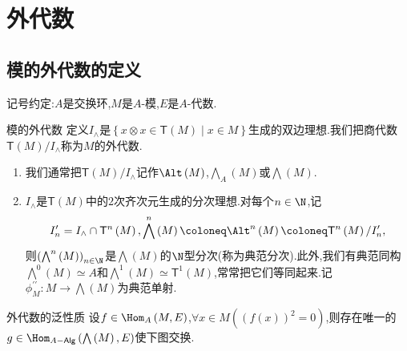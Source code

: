 \chapter{外代数}

\section{模的外代数的定义}

记号约定:$A$是交换环,$M$是$A$-模,$E$是$A$-代数.

\begin{definition}{模的外代数}{}
	定义$I_{\wedge}$是$\left\{x\otimes x\in\mathsf{T}\left(M\right)\middle|x\in M\right\}$生成的双边理想.我们把商代数$\mathsf{T}\left(M\right)/I_{\wedge}$称为$M$的外代数.
\end{definition}

\begin{remark}{}{}
	\begin{enumerate}
		\item 我们通常把$\mathsf{T}\left(M\right)/I_{\wedge}$记作$\Alt\left(M\right)$,$\bigwedge\limits_{A}\left(M\right)$或$\bigwedge\left(M\right)$.
		\item $I_{\wedge}$是$\mathsf{T}\left(M\right)$中的$2$次齐次元生成的分次理想.对每个$n\in\N$,记
		\begin{align*}
			I_{n}^{\prime}=I_{\wedge}\cap\mathsf{T}^{n}\left(M\right),\bigwedge\limits^{n}\left(M\right)\coloneq\Alt^{n}\left(M\right)\coloneq\mathsf{T}^{n}\left(M\right)/I_{n}^{\prime},
		\end{align*}
		则$\left(\bigwedge^{n}\left(M\right)\right)_{n\in\N}$是$\bigwedge\left(M\right)$的$\N$型分次(称为典范分次).此外,我们有典范同构$\bigwedge\limits^{0}\left(M\right)\simeq A$和$\bigwedge\limits^{1}\left(M\right)\simeq\mathsf{T}^{1}\left(M\right)$,常常把它们等同起来.记$\phi_{M}^{\prime\prime}:M\to\bigwedge\left(M\right)$为典范单射.
	\end{enumerate}
\end{remark}

\begin{proposition}{外代数的泛性质}{}
	设$f\in\Hom_{A}\left(M,E\right)$,$\forall x\in M\left(\left(f\left(x\right)\right)^{2}=0\right)$,则存在唯一的$g\in\Hom_{A-\mathsf{Alg}}\left(\bigwedge\left(M\right),E\right)$使下图交换.
	\begin{center}
	\end{center}
\end{proposition}

